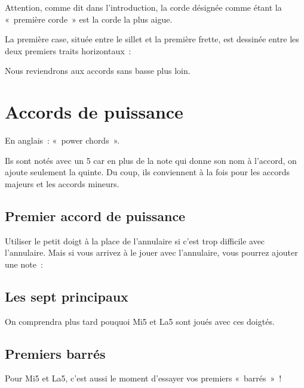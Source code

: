 \documentclass[11pt]{article}
\begin{document}
Attention, comme dit dans l’introduction, la corde désignée comme étant la
«~première corde~» est la corde la plus aigue.

La première case, située entre le sillet et la première frette, est
dessinée entre les deux premiers traits horizontaux~:


Nous reviendrons aux accords sans basse plus loin.

\section{Accords de puissance}

En anglais~: «~power chords~».

Ils sont notés avec un 5 car en plus de la note qui donne son nom à l’accord,
on ajoute seulement la quinte. Du coup, ils conviennent à la fois pour les
accords majeurs et les accords mineurs.

\subsection{Premier accord de puissance}


Utiliser le petit doigt à la place de l’annulaire si c’est trop difficile avec
l’annulaire. Mais si vous arrivez à le jouer avec l’annulaire, vous pourrez
ajouter une note~:


\subsection{Les sept principaux}


On comprendra plus tard pouquoi Mi5 et La5 sont joués avec ces doigtés.

\subsection{Premiers barrés}

Pour Mi5 et La5, c’est aussi le moment d’essayer vos premiers «~barrés~»~!

\end{document}
